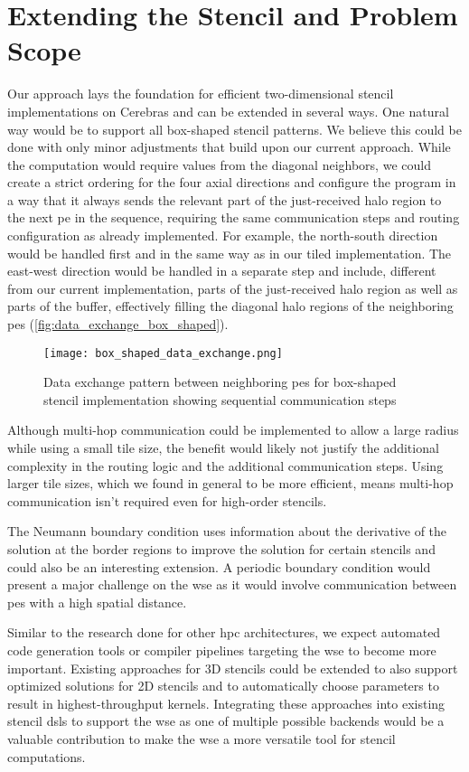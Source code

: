 \section{Extending the Stencil and Problem Scope}
Our approach lays the foundation for efficient two-dimensional stencil implementations on Cerebras and can be extended in several ways.
One natural way would be to support all box-shaped stencil patterns.
We believe this could be done with only minor adjustments that build upon our current approach.
While the computation would require values from the diagonal neighbors, we could create a strict ordering for the four axial directions and configure the program in a way that it always sends the relevant part of the just-received halo region to the next \ac{pe} in the sequence, requiring the same communication steps and routing configuration as already implemented. For example, the north-south direction would be handled first and in the same way as in our tiled implementation. The east-west direction would be handled in a separate step and include, different from our current implementation, parts of the just-received halo region as well as parts of the buffer, effectively filling the diagonal halo regions of the neighboring \acp{pe} (\autoref{fig:data_exchange_box_shaped}).

\begin{figure}[h]
    \centering
    \texttt{[image: box\_shaped\_data\_exchange.png]}
    \caption{Data exchange pattern between neighboring \acp{pe} for box-shaped stencil implementation showing sequential communication steps}
    \label{fig:data_exchange_box_shaped}
\end{figure}

Although multi-hop communication could be implemented to allow a large radius while using a small tile size, the benefit would likely not justify the additional complexity in the routing logic and the additional communication steps. Using larger tile sizes, which we found in general to be more efficient, means multi-hop communication isn't required even for high-order stencils.

The Neumann boundary condition uses information about the derivative of the solution at the border regions to improve the solution for certain stencils and could also be an interesting extension. A periodic boundary condition would present a major challenge on the \ac{wse} as it would involve communication between \acp{pe} with a high spatial distance. 

Similar to the research done for other \ac{hpc} architectures, we expect automated code generation tools or compiler pipelines targeting the \ac{wse} to become more important.
Existing approaches for 3D stencils \cite{sai2024automated} could be extended to also support optimized solutions for 2D stencils and to automatically choose parameters to result in highest-throughput kernels.
Integrating these approaches into existing stencil \acp{dsl} to support the \ac{wse} as one of multiple possible backends would be a valuable contribution to make the \ac{wse} a more versatile tool for stencil computations.